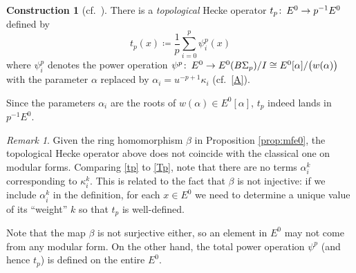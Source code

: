 \documentclass{gtpart}
\theoremstyle{definition}
\newtheorem{cstr}[equation]{Construction}
\theoremstyle{remark}
\newtheorem{rmk}[equation]{Remark}
\def\co{\colon\thinspace}
\newcommand{\A}{\alpha}
\newcommand{\B}{\beta}
\newcommand{\K}{\kappa}
\newcommand{\ce}{\coloneqq}
\renewcommand{\=}{\approx}
\renewcommand{\-}{\sim}
\numberwithin{equation}{section}
\begin{document}
\begin{cstr}[{cf.~\cite[1.12]{log}}]
 There is a {\em topological} Hecke operator $t_p \co E^0 \to p^{-1} E^0$ 
 defined by 
 \begin{equation}
  \label{tp}
  t_p(x) \ce \frac{1}{p} \sum_{i = 0}^p \psi^p_i(x) 
 \end{equation}
 where $\psi^p_i$ denotes the power operation 
 $\psi^p \co E^0 \to E^0(B\Sigma_p) / I \cong E^0[\A] / \big( w(\A) \big)$ with 
 the parameter $\A$ replaced by $\A_i = u^{-p + 1} \K_i$ (cf.~\eqref{A}).  
\end{cstr}

Since the parameters $\A_i$ are the roots of $w(\A) \in E^0[\A]$, $t_p$ indeed 
lands in $p^{-1} E^0$.  

\begin{rmk}
 \label{rmk:tc}
 Given the ring homomorphism $\B$ in Proposition \ref{prop:mfe0}, the 
 topological Hecke operator above does not coincide with the classical one on 
 modular forms.  Comparing \eqref{tp} to \eqref{Tp}, note that there are no 
 terms $\A_i^k$ corresponding to $\K_i^k$.  This is related to the fact that 
 $\B$ is not injective: if we include $\A_i^k$ in the definition, for each 
 $x \in E^0$ we need to determine a unique value of its ``weight'' $k$ so that 
 $t_p$ is well-defined.  

 Note that the map $\B$ is not surjective either, so an element in $E^0$ may not 
 come from any modular form.  On the other hand, the total power operation 
 $\psi^p$ (and hence $t_p$) is defined on the entire $E^0$.  
\end{rmk}
\end{document}
